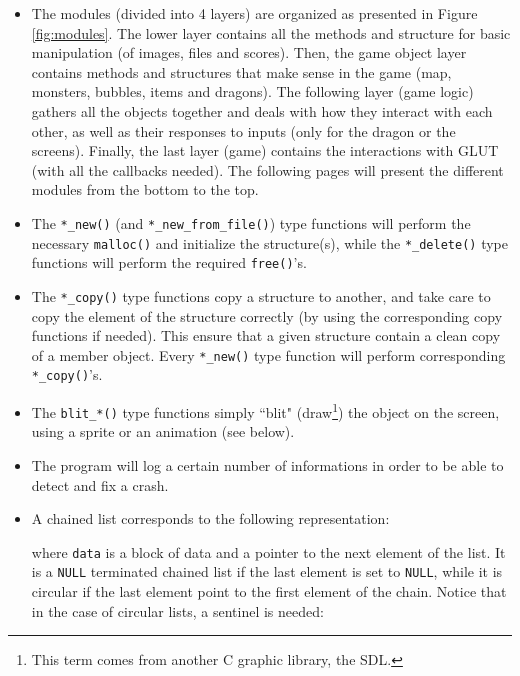 \documentclass[12pt,a4paper]{article}
\newcommand{\cc}[1]{\texttt{#1}}
\begin{document}
\begin{itemize}
\item The modules (divided into 4 layers) are organized as presented in Figure \ref{fig:modules}. The lower layer contains all the methods and structure for basic manipulation (of images, files and scores). Then, the game object layer contains methods and structures that make sense in the game (map, monsters, bubbles, items and dragons). The following layer (game logic) gathers all the objects together and deals with how they interact with each other, as well as their responses to inputs (only for the dragon or the screens). Finally, the last layer (game) contains the interactions with GLUT (with all the callbacks needed). The following pages will present the different modules from the bottom to the top.
\item The \cc{*_new()}  (and \cc{*_new_from_file()}) type functions will perform the necessary \cc{malloc()} and initialize the structure(s), while the \cc{*_delete()} type functions will perform the required \cc{free()}'s. 
\item The \cc{*_copy()} type functions copy a structure to another, and take care to copy the element of the structure correctly (by using the corresponding copy functions if needed). This ensure that a given structure contain a clean copy of a member object. Every \cc{*_new()} type function will perform corresponding \cc{*_copy()}'s.
\item  The \cc{blit_*()} type functions simply ``blit" (draw\footnote{This term comes from another C graphic library, the SDL.}) the object on the screen, using a sprite or an animation (see below). 
\item The program will log a certain number of informations in order to be able to detect and fix a crash.
\item A chained list corresponds to the following representation:\begin{center}
\end{center}
where \cc{data} is a block of data and  a pointer to the next element of the list. It is a \cc{NULL} terminated chained list if the last element is set to \cc{NULL}, while it is circular if the last element point to the first element of the chain. Notice that in the case of circular lists, a sentinel is needed: \begin{center}
\end{center}
\end{itemize}
\end{document}
